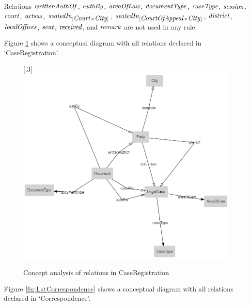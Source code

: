\documentclass[10pt,a4paper]{report}              %
\theoremstyle{plain}\theorembodyfont{\rmfamily}\newtheorem{definition}{Definition}[section]
\theoremstyle{plain}\theorembodyfont{\rmfamily}\newtheorem{designrule}[definition]{Requirement}
\def\id#1{\mbox{\em #1\/}}
\begin{document}
Relations ${\id{writtenAuthOf}}$, ${\id{authBy}}$, ${\id{areaOfLaw}}$, ${\id{documentType}}$, ${\id{caseType}}$, ${\id{session}}$, ${\id{court}}$, ${\id{actsas}}$, ${\id{seatedIn}}_{[{\id{Court}}{\times}{\id{City}}]}$, ${\id{seatedIn}}_{[{\id{CourtOfAppeal}}{\times}{\id{City}}]}$, ${\id{district}}$, ${\id{localOffices}}$, ${\id{sent}}$, ${\id{received}}$, and ${\id{remark}}$ are not used in any rule. 

Figure \ref{fig:LatCaseRegistration} shows a conceptual diagram with all relations declared in `CaseRegistration'.

\begin{figure}[htb]
\begin{center}
\scalebox{.3}[.3]{\includegraphics{LatCaseRegistration}}
\caption{Concept analysis of relations in CaseRegistration}
\label{fig:LatCaseRegistration}
\end{center}
\end{figure}
Figure \ref{fig:LatCorrespondence} shows a conceptual diagram with all relations declared in `Correspondence'.
\end{document}
